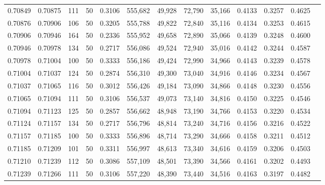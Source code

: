 \begin{tabular}{rrrrrrrrrrrrr}
0.70849 & 0.70875 &   111 &  50 &                                     0.3106 & 555,682 &  49,928 &  72,790 &  35,166 & 0.4133 & 0.3257 & 0.4625 \\
0.70876 & 0.70906 &   106 &  50 &                                     0.3205 & 555,788 &  49,822 &  72,840 &  35,116 & 0.4134 & 0.3253 & 0.4615 \\
0.70906 & 0.70946 &   164 &  50 &                                     0.2336 & 555,952 &  49,658 &  72,890 &  35,066 & 0.4139 & 0.3248 & 0.4600 \\
0.70946 & 0.70978 &   134 &  50 &                                     0.2717 & 556,086 &  49,524 &  72,940 &  35,016 & 0.4142 & 0.3244 & 0.4587 \\
0.70978 & 0.71004 &   100 &  50 &                                     0.3333 & 556,186 &  49,424 &  72,990 &  34,966 & 0.4143 & 0.3239 & 0.4578 \\
0.71004 & 0.71037 &   124 &  50 &                                     0.2874 & 556,310 &  49,300 &  73,040 &  34,916 & 0.4146 & 0.3234 & 0.4567 \\
0.71037 & 0.71065 &   116 &  50 &                                     0.3012 & 556,426 &  49,184 &  73,090 &  34,866 & 0.4148 & 0.3230 & 0.4556 \\
0.71065 & 0.71094 &   111 &  50 &                                     0.3106 & 556,537 &  49,073 &  73,140 &  34,816 & 0.4150 & 0.3225 & 0.4546 \\
0.71094 & 0.71123 &   125 &  50 &                                     0.2857 & 556,662 &  48,948 &  73,190 &  34,766 & 0.4153 & 0.3220 & 0.4534 \\
0.71124 & 0.71157 &   134 &  50 &                                     0.2717 & 556,796 &  48,814 &  73,240 &  34,716 & 0.4156 & 0.3216 & 0.4522 \\
0.71157 & 0.71185 &   100 &  50 &                                     0.3333 & 556,896 &  48,714 &  73,290 &  34,666 & 0.4158 & 0.3211 & 0.4512 \\
0.71185 & 0.71209 &   101 &  50 &                                     0.3311 & 556,997 &  48,613 &  73,340 &  34,616 & 0.4159 & 0.3206 & 0.4503 \\
0.71210 & 0.71239 &   112 &  50 &                                     0.3086 & 557,109 &  48,501 &  73,390 &  34,566 & 0.4161 & 0.3202 & 0.4493 \\
0.71239 & 0.71266 &   111 &  50 &                                     0.3106 & 557,220 &  48,390 &  73,440 &  34,516 & 0.4163 & 0.3197 & 0.4482 \\

\end{tabular}
